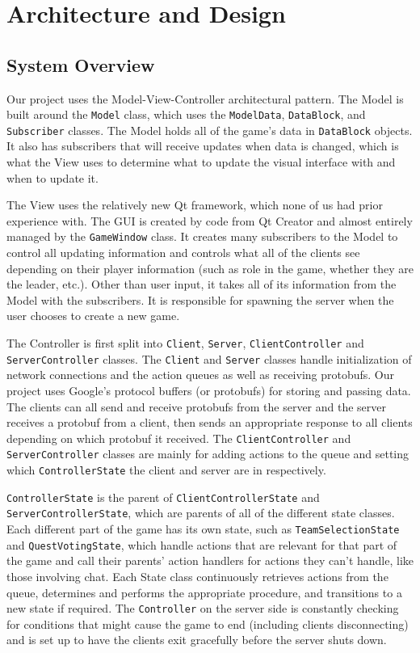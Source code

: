 \documentclass{hitec}
\begin{document}
\section{Architecture and Design}
\subsection{System Overview}
Our project uses the Model-View-Controller architectural pattern. The Model is built around the \texttt{Model} class, which uses the \texttt{ModelData}, \texttt{DataBlock}, and \texttt{Subscriber} classes. The Model holds all of the game’s data in \texttt{DataBlock} objects. It also has subscribers that will receive updates when data is changed, which is what the View uses to determine what to update the visual interface with and when to update it.

The View uses the relatively new Qt framework, which none of us had prior experience with. The GUI is created by code from Qt Creator and almost entirely managed by the \texttt{GameWindow} class. It creates many subscribers to the Model to control all updating information and controls what all of the clients see depending on their player information (such as role in the game, whether they are the leader, etc.). Other than user input, it takes all of its information from the Model with the subscribers. It is responsible for spawning the server when the user chooses to create a new game.

The Controller is first split into \texttt{Client}, \texttt{Server}, \texttt{ClientController} and \texttt{ServerController} classes. The \texttt{Client} and \texttt{Server} classes handle initialization of network connections and the action queues as well as receiving protobufs. Our project uses Google’s protocol buffers (or protobufs) for storing and passing data. The clients can all send and receive protobufs from the server and the server receives a protobuf from a client, then sends an appropriate response to all clients depending on which protobuf it received. The \texttt{ClientController} and \texttt{ServerController} classes are mainly for adding actions to the queue and setting which \texttt{ControllerState} the client and server are in respectively.

\texttt{ControllerState} is the parent of \texttt{ClientControllerState} and \texttt{ServerControllerState}, which are parents of all of the different state classes. Each different part of the game has its own state, such as \texttt{TeamSelectionState} and \texttt{QuestVotingState}, which handle actions that are relevant for that part of the game and call their parents’ action handlers for actions they can’t handle, like those involving chat. Each State class continuously retrieves actions from the queue, determines and performs the appropriate procedure, and transitions to a new state if required. The \texttt{Controller} on the server side is constantly checking for conditions that might cause the game to end (including clients disconnecting) and is set up to have the clients exit gracefully before the server shuts down. 
\end{document}
